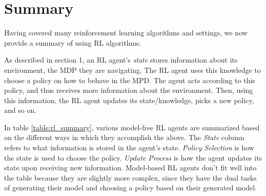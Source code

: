 \documentclass{article}
\newcommand{\ita}{\textit}
\begin{document}
\section{Summary}

Having covered many reinforcement learning algorithms and settings, we now provide a summary of using RL algorithms.

As described in section 1, an RL agent's \ita{state} stores information about its environment, the MDP they are navigating. The RL agent uses this knowledge to choose a policy on how to behave in the MPD. The agent acts according to this policy, and thus receives more information about the environment. Then, using this information, the RL agent updates its state/knowledge, picks a new policy, and so on.

In table \ref{table:rl_summary}, various model-free RL agents are summarized based on the different ways in which they accomplish the above. The \ita{State} column refers to what information is stored in the agent's state. \ita{Policy Selection} is how the state is used to choose the policy. \ita{Update Process} is how the agent updates its state upon receiving new information. Model-based RL agents don't fit well into the table because they are slightly more complex, since they have the dual tasks of generating their model and choosing a policy based on their generated model.
\end{document}
